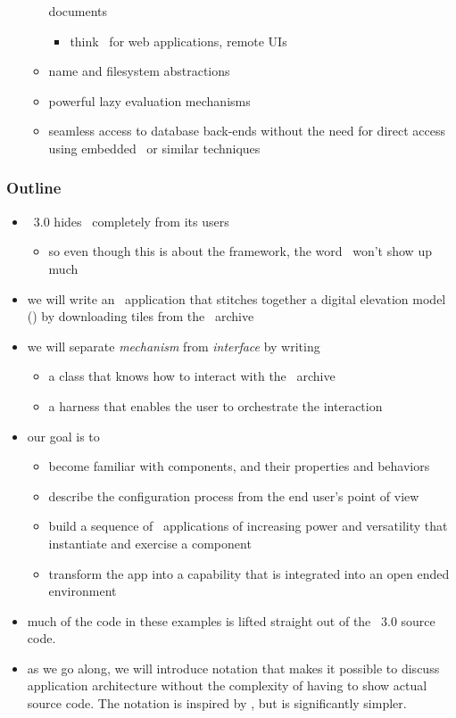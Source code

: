 \begin{frame}
\begin{itemize}
\begin{itemize}
        documents
        \begin{itemize}
        \item think \html\ for web applications, remote UIs
        \end{itemize}
      \item name and filesystem abstractions
      \item powerful lazy evaluation mechanisms
      \item seamless access to database back-ends without the need for direct access using
        embedded \sql\ or similar techniques
      \end{itemize}
%
  \end{itemize}
%
\end{frame}

\begin{frame}
%
  \frametitle{Outline}
%
  \begin{itemize}
%
  \item \isce\ 3.0 hides \pyre\ completely from its users
    \begin{itemize}
    \item so even though this is about the framework, the word \pyre\ won't show up much
    \end{itemize}
%
  \item we will write an \isce\ application that stitches together a digital elevation model
    (\dem) by downloading tiles from the \srtm\ archive
%
  \item we will separate \emph{mechanism} from \emph{interface} by writing
    \begin{itemize}
    \item a class that knows how to interact with the \srtm\ archive
    \item a harness that enables the user to orchestrate the interaction
    \end{itemize}
%
  \item our goal is to
    \begin{itemize}
    \item become familiar with components, and their properties and behaviors
    \item describe the configuration process from the end user's point of view
    \item build a sequence of \isce\ applications of increasing power and versatility that
      instantiate and exercise a component
    \item transform the app into a capability that is integrated into an open ended environment
    \end{itemize}
%
  \item much of the code in these examples is lifted straight out of the \isce\ 3.0 source
    code.
%
  \item as we go along, we will introduce notation that makes it possible to discuss
    application architecture without the complexity of having to show actual source code. The
    notation is inspired by \uml\supercite{uml-99,uml-05}, but is significantly simpler.
%
  \end{itemize}
%
\end{frame}

